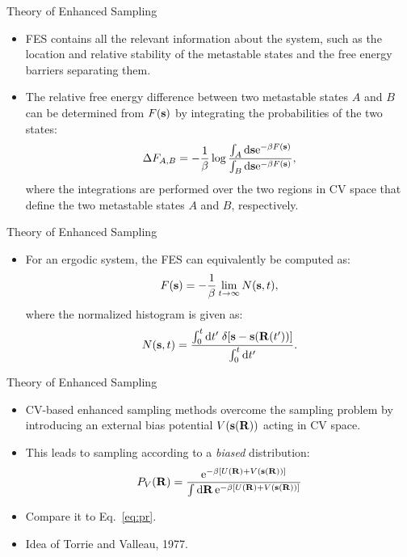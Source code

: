 \documentclass[10pt]{beamer}
\begin{document}
\begin{frame}{Theory of Enhanced Sampling}
\begin{itemize}
\setlength\itemsep{1em}
  \item FES contains all the relevant information about the system, such as the location and relative stability of the metastable states and the free energy barriers separating them.

  \item The relative free energy difference between two metastable states $A$ and $B$ can be determined from $F({\bf s})$ by integrating the probabilities of the two states:
  \begin{equation}
    \Delta F_{A,B} = -\frac{1}{\beta}\log\frac{\int_A \mathrm{d}{\bf s}\mathrm{e}^{-\beta F({\bf s})}}{\int_B \mathrm{d}{\bf s}\mathrm{e}^{-\beta F({\bf s})}},
  \end{equation}
  where the integrations are performed over the two regions in CV space that define the two metastable states $A$ and $B$, respectively.
\end{itemize}
\end{frame}

\begin{frame}{Theory of Enhanced Sampling}
\begin{itemize}
\setlength\itemsep{1em}
  \item For an ergodic system, the FES can equivalently be computed as:
  \begin{equation}
    F({\bf s}) = -\frac{1}{\beta} \lim_{t\rightarrow\infty} N({\bf s}, t),
  \end{equation}
  where the normalized histogram is given as:
  \begin{equation}
    N({\bf s},t) = \frac{\int_0^t \mathrm{d} t'\; \delta[{\bf s}-{\bf s}({\bf R}(t'))]}{\int_0^t \mathrm{d} t'}.
  \end{equation}
\end{itemize}
\end{frame}

\begin{frame}{Theory of Enhanced Sampling}
\begin{itemize}
\setlength\itemsep{1em}
  \item CV-based enhanced sampling methods overcome the sampling problem by introducing an external bias potential $V({\bf s}({\bf R}))$ acting in CV space.

  \item This leads to sampling according to a \textit{biased} distribution:
  \begin{equation}
    P_{V}(\mathbf{R}) = \frac{\mathrm{e}^{-\beta \left[U(\mathbf{R})+V(\mathbf{s}(\mathbf{R})) \right]}}{\int \mathrm{d}\mathbf{R} \,\mathrm{e}^{-\beta \left[U(\mathbf{R})+V(\mathbf{s}(\mathbf{R})) \right]}}
  \end{equation}

  \item Compare it to Eq.~\ref{eq:pr}.

  \item Idea of Torrie and Valleau, 1977.
\end{itemize}
\end{frame}
\end{document}
